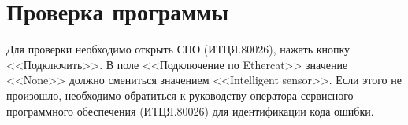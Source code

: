 \newpage
\section{Проверка программы}

Для проверки необходимо открыть СПО (ИТЦЯ.80026), нажать кнопку <<Подключить>>. В поле <<Подключение по Ethercat>> 
значение <<None>> должно смениться значением <<Intelligent sensor>>. Если этого не произошло, необходимо обратиться к
руководству оператора сервисного программного обеспечения (ИТЦЯ.80026) для идентификации кода ошибки.
